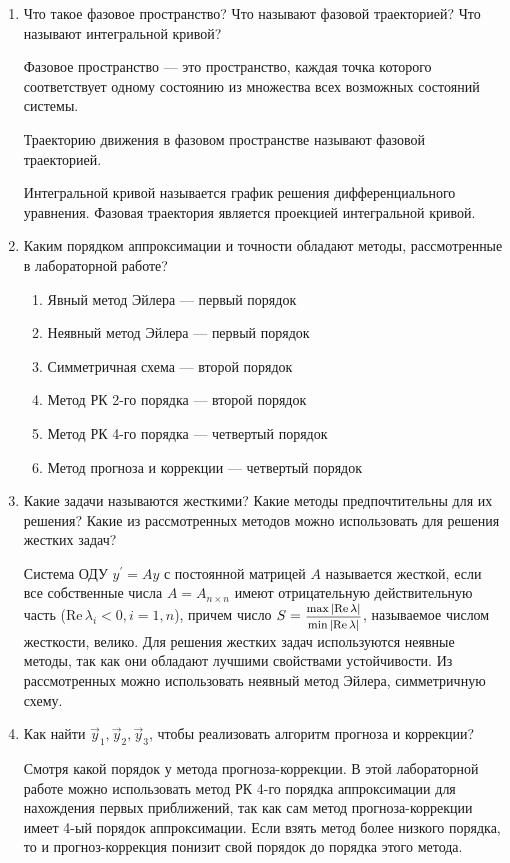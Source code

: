 \documentclass[12pt, a4paper]{article}
\begin{document}
\begin{enumerate}
\item Что такое фазовое пространство? Что называют фазовой траекторией? Что называют интегральной кривой? 

Фазовое пространство --- это пространство, каждая точка которого соответствует одному состоянию из множества всех возможных состояний системы.

Траекторию движения в фазовом пространстве называют фазовой траекторией.

Интегральной кривой называется график решения дифференциального уравнения. Фазовая траектория является проекцией интегральной кривой.

\item Каким порядком аппроксимации и точности обладают методы, рассмотренные в лабораторной работе?
\begin{enumerate}
\item Явный метод Эйлера --- первый порядок 
\item Неявный метод Эйлера --- первый порядок
\item Симметричная схема --- второй порядок
\item Метод РК 2-го порядка --- второй порядок
\item Метод РК 4-го порядка --- четвертый порядок
\item Метод прогноза и коррекции --- четвертый порядок
\end{enumerate}
\item Какие задачи называются жесткими? Какие методы предпочтительны для их решения? Какие из рассмотренных методов можно использовать для решения жестких задач?

Система ОДУ $y^' = Ay$ с постоянной матрицей $A$ называется жесткой, если все собственные числа $A=A_{n\times n}$ имеют отрицательную действительную часть ($\text{Re}\, \lambda_i < 0, i=1,n$), причем число $S = \hbox{\footnotesize$\displaystyle\frac{\max|\text{Re}\, \lambda|}{\min|\text{Re}\, \lambda|}$}$, называемое числом жесткости, велико.
Для решения жестких задач используются неявные методы, так как они обладают лучшими свойствами устойчивости. Из рассмотренных можно использовать неявный метод Эйлера, симметричную схему.

\item Как найти $\vec{y}_1, \vec{y}_2, \vec{y}_3$, чтобы реализовать алгоритм прогноза и коррекции?

Смотря какой порядок у метода прогноза-коррекции. В этой лабораторной работе можно использовать метод РК 4-го порядка аппроксимации для нахождения первых приближений, так как сам метод прогноза-коррекции имеет 4-ый порядок аппроксимации. Если взять метод более низкого порядка, то и прогноз-коррекция понизит свой порядок до порядка этого метода.


\end{enumerate}
\end{document}
